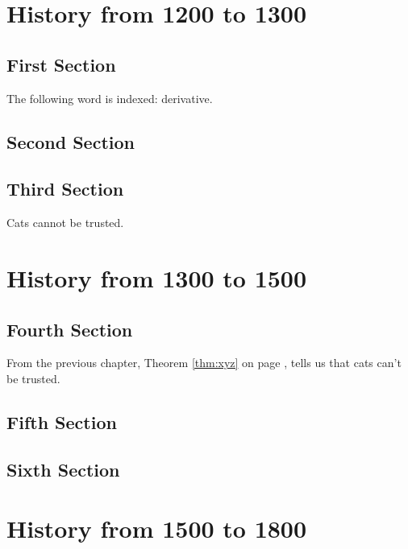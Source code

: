 \chapter{History from 1200 to 1300}

\section{First Section }

The following word is indexed: 
derivative.

\lipsum[1-3]

\section{Second Section}
\lipsum[1-4]

\section{Third Section}
\lipsum[1-5]

\begin{thm}\label{thm:xyz}
  Cats cannot be trusted.
\end{thm}



\chapter{History from 1300 to 1500}

\section{Fourth Section }
\lipsum[1-6]

From the previous chapter, Theorem \ref{thm:xyz} on page \pageref{thm:xyz},
tells us that cats can't be trusted.

\section{Fifth Section }
\lipsum[1-7]

\section{Sixth Section }
\lipsum[1-8]

\chapter{History from 1500 to 1800}

